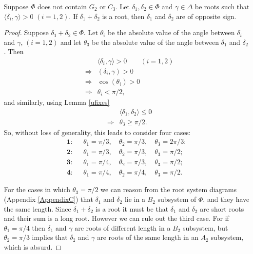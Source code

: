 \begin{lemma} \label{uabelian}
Suppose $\Phi$ does not contain $G_2$ or $C_3$. Let $\delta_1, \delta_2 \in \Phi$ and $\gamma \in \Delta$ be roots such that $\langle \delta_i, \gamma \rangle > 0$ $(i = 1, 2)$. If $\delta_1 + \delta_2$ is a root, then $\delta_1$ and $\delta_2$ are of opposite sign.
\end{lemma}
\begin{proof}
Suppose $\delta_1 + \delta_2 \in \Phi$. Let $\theta_i$ be the absolute value of the angle between $\delta_i$ and $\gamma$, $(i = 1,2)$ and let $\theta_3$ be the absolute value of the angle between $\delta_1$ and $\delta_2$. Then
\begin{eqnarray*}
&& \langle \delta_i, \gamma\rangle > 0 \qquad (i=1,2) \\
& \Longrightarrow& (\delta_i, \gamma) > 0 \\
& \Longrightarrow& \cos(\theta_i) > 0 \\
& \Longrightarrow& \theta_i < \pi/2,
\end{eqnarray*}
and similarly, using Lemma \ref{ufixes}
\begin{eqnarray*}
&& \langle \delta_1, \delta_2 \rangle \leq 0 \\
& \Longrightarrow& \theta_3 \geq \pi/2.
\end{eqnarray*}
So, without loss of generality, this leads to consider four cases:
\begin{eqnarray*}
\textbf{1:}&&\theta_1 = \pi/3,\quad\theta_2 = \pi/3,\quad\theta_3 = 2\pi/3; \\
\textbf{2:}&&\theta_1 = \pi/3,\quad\theta_2 = \pi/3,\quad\theta_3 = \pi/2; \\
\textbf{3:}&&\theta_1 = \pi/4,\quad\theta_2 = \pi/3,\quad\theta_3 = \pi/2; \\
\textbf{4:}&&\theta_1 = \pi/4,\quad\theta_2 = \pi/4,\quad\theta_3 = \pi/2.
\end{eqnarray*}

For the cases in which $\theta_3 = \pi/2$ we can reason from the root system diagrams (Appendix \ref{AppendixC}) that $\delta_1$ and $\delta_2$ lie in a $B_2$ subsystem of $\Phi$, and they have the same length. Since $\delta_1+\delta_2$ is a root it must be that $\delta_1$ and $\delta_2$ are short roots and their sum is a long root. However we can rule out the third case. For if $\theta_1 = \pi/4$ then $\delta_1$ and $\gamma$ are roots of different length in a $B_2$ subsystem, but $\theta_2 = \pi/3$ implies that $\delta_2$ and $\gamma$ are roots of the same length in an $A_2$ subsystem, which is absurd.


\end{proof}

